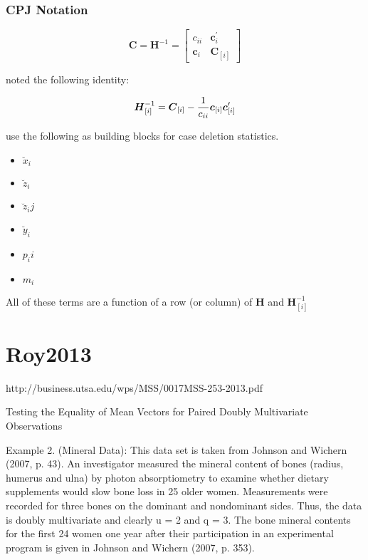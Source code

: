 \documentclass[12pt, a4paper]{report}
\theoremstyle{plain}
\theoremstyle{definition}
\theoremstyle{remark}
\begin{document}

\subsection{CPJ Notation}

\[ \boldsymbol{C} = \boldsymbol{H}^{-1} = \left[
\begin{array}{cc}
c_{ii} & \boldsymbol{c}_{i}^{\prime}\\
\boldsymbol{c}_{i} &  \boldsymbol{C}_{[i]}
\end{array} \right]
\]

\citet{CPJ} noted the following identity:

\[ \boldsymbol{H}_{[i]}^{-1}  = \boldsymbol{C}_{[i]} - {1 \over c_{ii}}\boldsymbol{c}_{[i]}\boldsymbol{c}_{[i]}^{\prime} \]


\citet{CPJ} use the following as building blocks for case deletion statistics.
\begin{itemize}
\item $\breve{x}_i$
\item $\breve{z}_i$
\item $\breve{z}_ij$
\item $\breve{y}_i$
\item $p_ii$
\item $m_i$
\end{itemize}
All of these terms are a function of a row (or column) of $\boldsymbol{H}$ and $\boldsymbol{H}_{[i]}^{-1}$

\chapter{Roy2013}

http://business.utsa.edu/wps/MSS/0017MSS-253-2013.pdf


Testing the Equality of Mean Vectors for Paired Doubly Multivariate Observations 


Example 2. (Mineral Data): This data set is taken from Johnson and Wichern (2007, p. 43).
An investigator measured the mineral content of bones (radius, humerus and ulna) by photon
absorptiometry to examine whether dietary supplements would slow bone loss in 25 older women.
Measurements were recorded for three bones on the dominant and nondominant sides. Thus,
the data is doubly multivariate and clearly u = 2 and q = 3.
The bone mineral contents for the ﬁrst 24 women one year after their participation in an
experimental program is given in Johnson and Wichern (2007, p. 353). 
\end{document}
